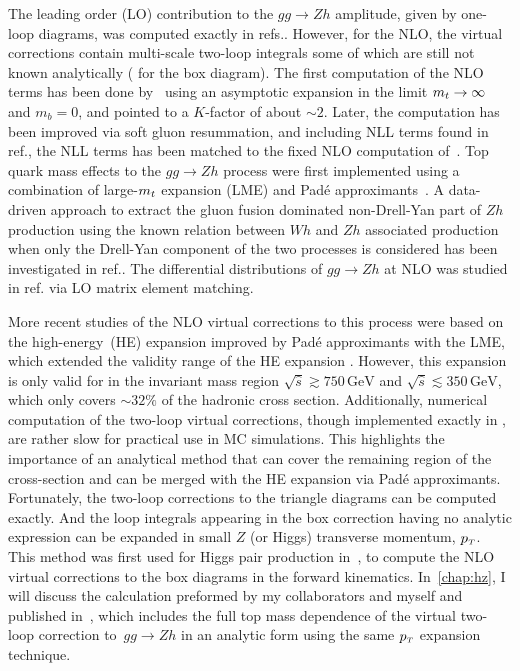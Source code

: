 \par  The leading order (LO) contribution to the $g g \rightarrow Z h$ amplitude, given by one-loop diagrams, was computed exactly in refs.\cite{Kniehl:1990iva, Dicus:1988yh}. However, for the NLO, the virtual corrections contain multi-scale two-loop integrals some of which are still not known analytically ( for the box diagram).  The first computation of the NLO terms has been done by~\cite{Altenkamp:2012sx} using an asymptotic expansion in the limit
$m_t \rightarrow \infty$ and $m_b = 0$, and pointed to a $K$-factor of about $\sim2$.  Later, the computation has been improved via soft gluon resummation, and including NLL terms found in ref.\cite{Harlander:2014wda}, the NLL terms has been matched to the fixed NLO computation of~\cite{Altenkamp:2012sx}.  Top quark mass effects to the  $g g \rightarrow Zh$ process were first implemented using a combination of  large-$m_t$ expansion (LME) and Pad\'e approximants~\cite{Hasselhuhn:2016rqt}. A data-driven approach to extract the gluon fusion dominated non-Drell-Yan part of $Zh$ production using the known relation between  $Wh$
and $ Z h$ associated production when only the Drell-Yan component of the two processes is considered has been investigated in ref.\cite{Harlander:2018yns}. The differential distributions of $g g \rightarrow Zh$  at NLO was studied in ref.\cite{Hespel:2015zea} via LO matrix element matching. 
\par More recent studies of the NLO virtual corrections to this process were based on the high-energy~(HE) expansion improved by Pad\'e approximants with the LME, which extended the validity range of the HE expansion \cite{Davies:2020drs}. However, this expansion is only valid for in the invariant mass region $\sqrt{\hat{s}}  \gtrsim 750\, \si{\GeV} $ and $\sqrt{\hat{s}}  \lesssim 350\,  \si{\GeV}$,  which only covers $\sim 32\%$ of the hadronic cross section. Additionally, numerical computation of the two-loop virtual corrections, though implemented exactly in  \cite{Chen:2020gae}, are rather slow for practical use in MC simulations.  This highlights the importance of an analytical method that can cover the remaining region of the cross-section and can be merged with the HE expansion via Pad\'e approximants. Fortunately, the two-loop corrections to the triangle diagrams can be computed exactly. And the loop integrals appearing in the box correction having no analytic expression can be expanded in small  $Z$ (or Higgs) 
transverse momentum, $p_{\scriptscriptstyle T}$. This method was first used for Higgs pair production in~\cite{Bonciani:2018omm}, to compute the NLO virtual corrections to the box diagrams in the forward kinematics. In~\autoref{chap:hz}, I will discuss the calculation preformed by my collaborators and myself and published in~\cite{Alasfar:2021ppe}, which includes the full top mass dependence of the virtual two-loop correction to~$ gg \to Zh$ in an  analytic form  using the same $p_{\scriptscriptstyle T}$ expansion technique.

